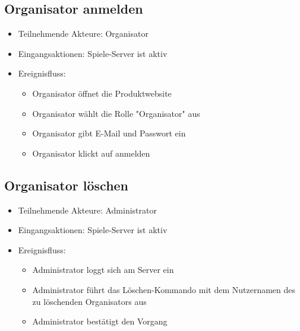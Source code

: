 \documentclass[a4paper]{scrreprt}
\begin{document}
    \subsection{Organisator anmelden}
    \begin{itemize}
        \item Teilnehmende Akteure: \Gls{Organisator}
        \item Eingangsaktionen: Spiele-Server ist aktiv
        \item Ereignisfluss:
        \begin{itemize}
            \item Organisator öffnet die Produktwebsite
            \item Organisator wählt die Rolle "Organisator" aus
            \item Organisator gibt E-Mail und Passwort ein
            \item Organisator klickt auf anmelden
        \end{itemize}
    \end{itemize}

    \subsection{Organisator löschen}
    \begin{itemize}
        \item Teilnehmende Akteure: \Gls{Administrator}
        \item Eingangsaktionen: Spiele-Server ist aktiv
        \item Ereignisfluss:
        \begin{itemize}
            \item Administrator loggt sich am Server ein
            \item Administrator führt das Löschen-Kommando mit dem Nutzernamen des zu löschenden Organisators aus
            \item Administrator bestätigt den Vorgang
        \end{itemize}
    \end{itemize}
\end{document}
